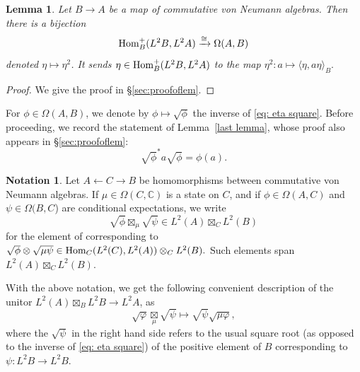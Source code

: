 \documentclass[10pt,a4paper,oneside]{amsart}
\newtheorem{lemma}[theorem]{Lemma}
\theoremstyle{remark}
\theoremstyle{definition}
\newtheorem{notation}[theorem]{Notation}
\newcommand{\tn}[1]{\textnormal{#1}}
\newcommand{\Hom}{\textnormal{Hom}}
\newcommand{\rar}{\rightarrow}
\newcommand{\cofu}[1]{\mathop{\boxtimes}_{#1}}
\newcommand{\homtocond}[1]{#1^2}
\begin{document}
\begin{lemma}\label{lem:homtocondexp}
	Let $B\rar A$ be a map of commutative von Neumann algebras. Then there is a bijection
\begin{equation}\label{eq: eta square}
\Hom^\tn{+}_B(L^2B, L^2A) \xrightarrow{\cong} \Omega(A,B)
\end{equation}
denoted $\eta\mapsto \homtocond{\eta}$. It sends $\eta\in \Hom^\tn{+}_B(L^2B, L^2A)$ to the map
$
	\homtocond{\eta}  \colon a \mapsto \langle \eta, a \eta \rangle_B.
$ %
\end{lemma}

\begin{proof}
We give the proof in \S\ref{sec:proofoflem}.
\end{proof}

For $\phi\in\Omega(A,B)$, we denote by $\phi\mapsto \sqrt\phi$ the inverse of \eqref{eq: eta square}.
Before proceeding,
we record the statement of
Lemma~\ref{last lemma}, whose proof also appears in \S\ref{sec:proofoflem}:
\begin{equation}\label{last eq}
\sqrt{\phi}^* a \sqrt{\phi} = \phi(a).
\end{equation}


\begin{notation}\label{notation:fusionofLtwos}
Let $A\leftarrow C\rar B$ be homomorphisms between commutative von Neumann algebras.
If $\mu\in\Omega(C,\mathbb C)$ is a state on $C$, and if $\phi\in \Omega(A,C)$ and $\psi\in \Omega(B,C$) are conditional expectations, we write $$\sqrt{\phi}\cofu{\mu}\sqrt{\psi}\in L^2(A)\cofu{C}L^2(B)$$ for the element of corresponding to 
	$
	\sqrt{\phi}\otimes \sqrt{\mu \psi} \in \Hom_C(L^2(C), L^2(A))\otimes_{C} L^2(B).
	$ 
Such elements
span $L^2(A)\cofu{C}L^2(B)$.
\end{notation}
    
With the above notation, we get the following convenient description of the unitor $L^2(A) \cofu{B} L^2B \rar L^2A$, as
    \begin{equation}\label{e:formofunitor}
    \sqrt{\varphi}\underset{\mu}\boxtimes \sqrt{\psi}\mapsto
\sqrt{\psi}\sqrt{\mu\varphi},
    \end{equation}
where the $\sqrt{\psi}$ 
in the right hand side refers to the usual square root (as opposed to the inverse of \eqref{eq: eta square})
of the positive element of $B$ corresponding to $\psi:L^2B\to L^2B$.\bigskip
\end{document}
